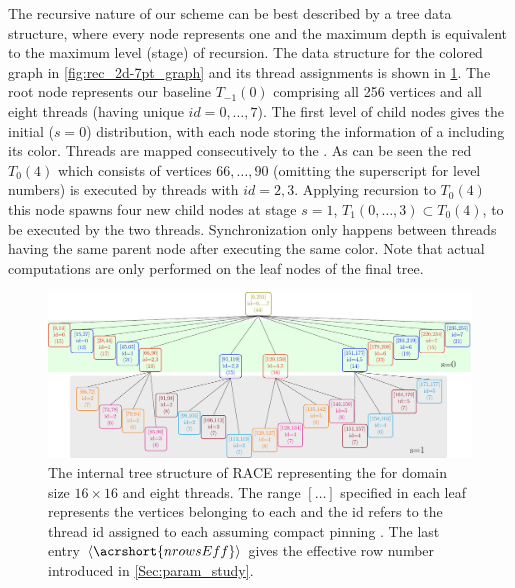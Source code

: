 The recursive nature of our scheme can be best  described by a tree data structure, where every node represents one \levelGroup and  the maximum depth is equivalent to the maximum level (stage) of recursion. The data structure for the colored graph in \cref{fig:rec_2d-7pt_graph} and its thread assignments is shown in \cref{fig:rec_2d-7pt_tree}. The root node represents our baseline \levelGroup $T_{-1}(0)$ comprising all 256 vertices and all eight threads (having unique $id=0,\ldots,7$). The first level of child nodes gives the initial ($s=0$) distribution, with each node storing the information of a \levelGroup including its color. Threads are mapped consecutively to the \levelGroups. As can be seen the red $T_0(4)$ \levelGroup which consists of vertices $66,\ldots,90$ (omitting the superscript for level numbers) is executed by threads with $id=2,3$.  Applying recursion to $T_0(4)$ this node spawns four new child nodes at stage $s =1$, \ie \levelGroups $T_1(0,\ldots,3) \subset T_0(4)$, to be executed by the two threads. Synchronization only happens between threads having the same parent node after executing the same color. Note that actual computations are only performed on the leaf nodes of the final tree.
	 \begin{figure}[thbp]
		 \includegraphics[width=\textwidth, height=0.2\textheight]{pics/recursion/2d-7pt_example/tree/tree}
	 	\caption{The internal tree structure of \acrshort{RACE} representing the \stex for domain size $16 \times 16$ and eight threads. The range $[\ldots]$ specified in each leaf represents the vertices belonging to each \levelGroup and the id refers to the thread id assigned to each \levelGroup assuming compact pinning . The last entry $\langle\acrshort{nrowsEff}\rangle$ gives the effective row number introduced in  \cref{Sec:param_study}. }
	 	\label{fig:rec_2d-7pt_tree}
	 \end{figure}

